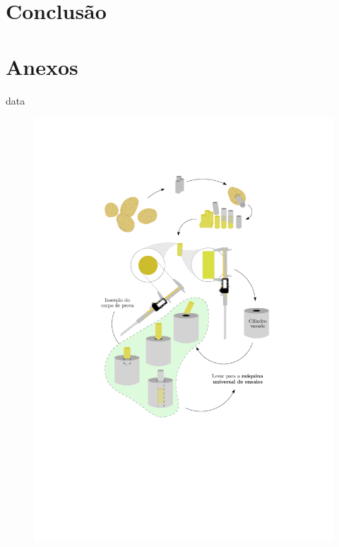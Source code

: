 \documentclass[a4paper, 12pt]{article}
\begin{document}
	\section{Conclusão}
	
	\section{Anexos}
	
	{data}
	\begin{figure}
		\centering
		\includegraphics[scale=1.1]{images/diagram}
	\end{figure}
\end{document}

